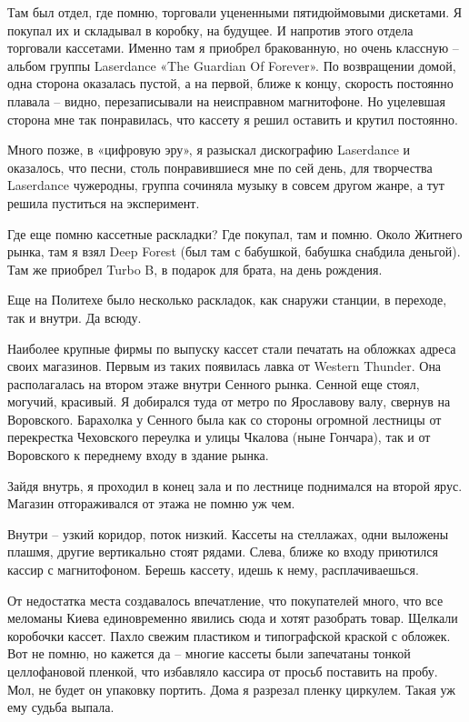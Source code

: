 Там был отдел, где помню, торговали уцененными пятидюймовыми дискетами. Я покупал их и складывал в коробку, на будущее. И напротив этого отдела торговали кассетами. Именно там я приобрел бракованную, но очень классную – альбом группы Laserdance «The Guardian Of Forever». По возвращении домой, одна сторона оказалась пустой, а на первой, ближе к концу, скорость постоянно плавала – видно, перезаписывали на неисправном магнитофоне. Но уцелевшая сторона мне так понравилась, что кассету я решил оставить и крутил постоянно. 

Много позже, в «цифровую эру», я разыскал дискографию Laserdance и оказалось, что песни, столь понравившиеся мне по сей день, для творчества Laserdance чужеродны, группа сочиняла музыку в совсем другом жанре, а тут решила пуститься на эксперимент. 

Где еще помню кассетные раскладки? Где покупал, там и помню. Около Житнего рынка, там я взял Deep Forest (был там с бабушкой, бабушка снабдила деньгой). Там же приобрел Turbo B, в подарок для брата, на день рождения. 

Еще на Политехе было несколько раскладок, как снаружи станции, в переходе, так и внутри. Да всюду.

Наиболее крупные фирмы по выпуску кассет стали печатать на обложках адреса своих магазинов. Первым из таких появилась лавка от Western Thunder. Она располагалась на втором этаже внутри Сенного рынка. Сенной еще стоял, могучий, красивый. Я добирался туда от метро по Ярославову валу, свернув на Воровского. Барахолка у Сенного была как со стороны огромной лестницы от перекрестка Чеховского переулка и улицы Чкалова (ныне Гончара), так и от Воровского к переднему входу в здание рынка.

Зайдя внутрь, я проходил в конец зала и по лестнице поднимался на второй ярус. Магазин отгораживался от этажа не помню уж чем.

Внутри – узкий коридор, поток низкий. Кассеты на стеллажах, одни выложены плашмя, другие вертикально стоят рядами. Слева, ближе ко входу приютился кассир с магнитофоном. Берешь кассету, идешь к нему, расплачиваешься.

От недостатка места создавалось впечатление, что покупателей много, что все меломаны Киева единовременно явились сюда и хотят разобрать товар. Щелкали коробочки кассет. Пахло свежим пластиком и типографской краской с обложек. Вот не помню, но кажется да – многие кассеты были запечатаны тонкой целлофановой пленкой, что избавляло кассира от просьб поставить на пробу. Мол, не будет он упаковку портить. Дома я разрезал пленку циркулем. Такая уж ему судьба выпала.

